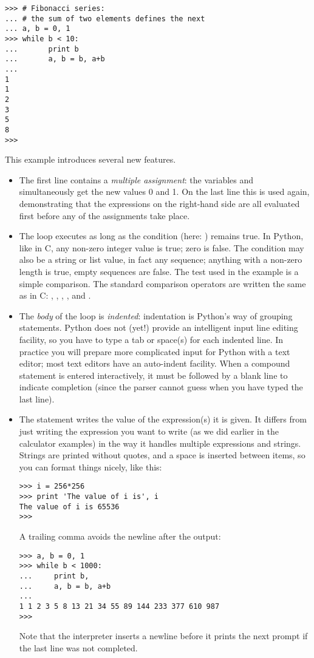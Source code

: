 \bcode\begin{verbatim}
>>> # Fibonacci series:
... # the sum of two elements defines the next
... a, b = 0, 1
>>> while b < 10:
...       print b
...       a, b = b, a+b
... 
1
1
2
3
5
8
>>> 
\end{verbatim}\ecode
%
This example introduces several new features.

\begin{itemize}

\item
The first line contains a \emph{multiple assignment}: the variables
 and  simultaneously get the new values 0 and 1.  On the
last line this is used again, demonstrating that the expressions on
the right-hand side are all evaluated first before any of the
assignments take place.

\item
The  loop executes as long as the condition (here: ) remains true.  In Python, like in C, any non-zero integer value is
true; zero is false.  The condition may also be a string or list value,
in fact any sequence; anything with a non-zero length is true, empty
sequences are false.  The test used in the example is a simple
comparison.  The standard comparison operators are written the same as
in C: \code{<}, \code{>}, \code{==}, \code{<=}, \code{>=} and \code{!=}.

\item
The \emph{body} of the loop is \emph{indented}: indentation is Python's
way of grouping statements.  Python does not (yet!) provide an
intelligent input line editing facility, so you have to type a tab or
space(s) for each indented line.  In practice you will prepare more
complicated input for Python with a text editor; most text editors have
an auto-indent facility.  When a compound statement is entered
interactively, it must be followed by a blank line to indicate
completion (since the parser cannot guess when you have typed the last
line).

\item
The  statement writes the value of the expression(s) it is
given.  It differs from just writing the expression you want to write
(as we did earlier in the calculator examples) in the way it handles
multiple expressions and strings.  Strings are printed without quotes,
and a space is inserted between items, so you can format things nicely,
like this:

\bcode\begin{verbatim}
>>> i = 256*256
>>> print 'The value of i is', i
The value of i is 65536
>>> 
\end{verbatim}\ecode
%
A trailing comma avoids the newline after the output:

\bcode\begin{verbatim}
>>> a, b = 0, 1
>>> while b < 1000:
...     print b,
...     a, b = b, a+b
... 
1 1 2 3 5 8 13 21 34 55 89 144 233 377 610 987
>>> 
\end{verbatim}\ecode
%
Note that the interpreter inserts a newline before it prints the next
prompt if the last line was not completed.

\end{itemize}


